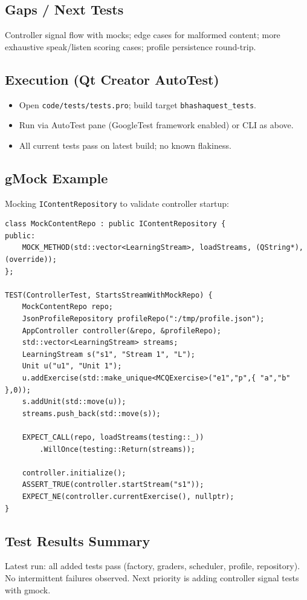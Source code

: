 \documentclass{article}
\begin{document}
\subsection{Gaps / Next Tests}
Controller signal flow with mocks; edge cases for malformed content; more exhaustive speak/listen scoring cases; profile persistence round-trip.

\subsection{Execution (Qt Creator AutoTest)}
\begin{itemize}
  \item Open \texttt{code/tests/tests.pro}; build target \texttt{bhashaquest\_tests}.
  \item Run via AutoTest pane (GoogleTest framework enabled) or CLI as above.
  \item All current tests pass on latest build; no known flakiness.
\end{itemize}

\subsection{gMock Example}
Mocking \texttt{IContentRepository} to validate controller startup:
\begin{lstlisting}[caption={EXPECT\_CALL example}, captionpos=b]
class MockContentRepo : public IContentRepository {
public:
    MOCK_METHOD(std::vector<LearningStream>, loadStreams, (QString*), (override));
};

TEST(ControllerTest, StartsStreamWithMockRepo) {
    MockContentRepo repo;
    JsonProfileRepository profileRepo(":/tmp/profile.json");
    AppController controller(&repo, &profileRepo);
    std::vector<LearningStream> streams;
    LearningStream s("s1", "Stream 1", "L");
    Unit u("u1", "Unit 1");
    u.addExercise(std::make_unique<MCQExercise>("e1","p",{ "a","b" },0));
    s.addUnit(std::move(u));
    streams.push_back(std::move(s));

    EXPECT_CALL(repo, loadStreams(testing::_))
        .WillOnce(testing::Return(streams));

    controller.initialize();
    ASSERT_TRUE(controller.startStream("s1"));
    EXPECT_NE(controller.currentExercise(), nullptr);
}
\end{lstlisting}

\subsection{Test Results Summary}
Latest run: all added tests pass (factory, graders, scheduler, profile, repository). No intermittent failures observed. Next priority is adding controller signal tests with gmock.
\end{document}
